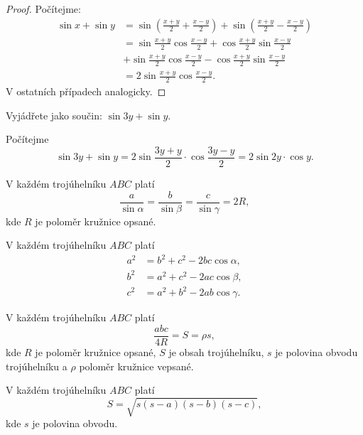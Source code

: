 \begin{proof}
    Počítejme:
    \begin{align*}
        \sin x + \sin y & = \sin \left(\frac{x+y}{2}+\frac{x-y}{2}\right)+ \sin \left(\frac{x+y}{2}-\frac{x-y}{2}\right ) \\
        & = \sin \frac{x+y}{2} \cos\frac{x-y}{2} + \cos\frac{x+y}{2} \sin \frac{x-y}{2} \\
        & + \sin \frac{x+y}{2} \cos\frac{x-y}{2} -  \cos\frac{x+y}{2} \sin \frac{x-y}{2}\\
        & = 2\sin \frac{x+y}{2} \cos\frac{x-y}{2}.
    \end{align*}
  V ostatních případech analogicky.
\end{proof}

\begin{priklad}
Vyjádřete jako součin: $\sin 3y+\sin y.$
\end{priklad}

\begin{reseni}
Počítejme
$$
\sin 3y+\sin y=2\sin \frac{3y+y}{2}\cdot \cos \frac{3y-y}{2}=2\sin 2y \cdot \cos y.
$$
\end{reseni}

\begin{veta}
    V každém trojúhelníku $ABC$ platí
    $$\frac{a}{\sin \alpha} = \frac{b}{\sin \beta}=\frac{c}{\sin \gamma}=2R,$$
    kde $R$ je poloměr kružnice opsané.
\end{veta}

\begin{veta}
 V každém trojúhelníku $ABC$ platí
 \begin{align*}
    a^2 &= b^2+c^2-2bc\cos \alpha, \\
    b^2 &= a^2+c^2-2ac\cos \beta ,\\
    c^2 &= a^2+b^2-2ab\cos \gamma.
 \end{align*}
\end{veta}

\begin{veta}\label{obsahtroj}
     V každém trojúhelníku $ABC$ platí
     $$\frac{abc}{4R}=S=\rho s,$$
     kde $R$ je poloměr kružnice opsané, $S$ je obsah trojúhelníku, $s$ je polovina obvodu trojúhelníku a $\rho$ poloměr kružnice vepsané.
\end{veta}

\begin{veta}
    V každém trojúhelníku $ABC$ platí
    $$S=\sqrt{s(s-a)(s-b)(s-c)}, $$
    kde $s$ je polovina obvodu.
\end{veta}

